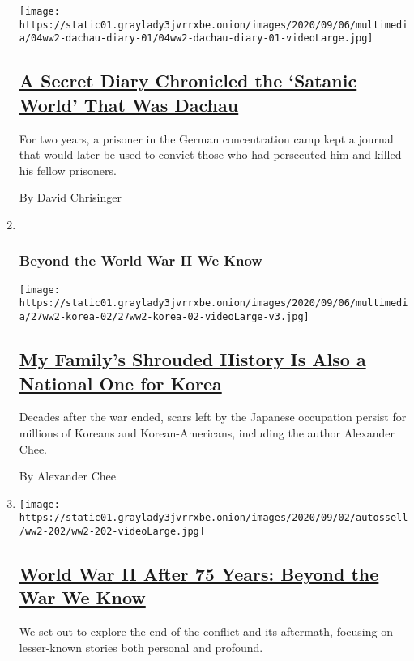 \begin{enumerate}
  \texttt{[image: https://static01.graylady3jvrrxbe.onion/images/2020/09/06/multimedia/04ww2-dachau-diary-01/04ww2-dachau-diary-01-videoLarge.jpg]}

  \hypertarget{a-secret-diary-chronicled-the-satanic-world-that-was-dachau}{%
  \subsection{\texorpdfstring{\href{/2020/09/04/magazine/-secret-diarist-dachau.html}{A
  Secret Diary Chronicled the `Satanic World' That Was
  Dachau}}{A Secret Diary Chronicled the `Satanic World' That Was Dachau}}\label{a-secret-diary-chronicled-the-satanic-world-that-was-dachau}}

  For two years, a prisoner in the German concentration camp kept a
  journal that would later be used to convict those who had persecuted
  him and killed his fellow prisoners.

  By David Chrisinger
\item ~
  \hypertarget{beyond-the-world-war-ii-we-know-1}{%
  \subsubsection{Beyond the World War II We
  Know}\label{beyond-the-world-war-ii-we-know-1}}

  \texttt{[image: https://static01.graylady3jvrrxbe.onion/images/2020/09/06/multimedia/27ww2-korea-02/27ww2-korea-02-videoLarge-v3.jpg]}

  \hypertarget{my-familys-shrouded-history-is-also-a-national-one-for-korea}{%
  \subsection{\texorpdfstring{\href{/2020/08/27/magazine/korea-japanese-occupation-surrender-ww2.html}{My
  Family's Shrouded History Is Also a National One for
  Korea}}{My Family's Shrouded History Is Also a National One for Korea}}\label{my-familys-shrouded-history-is-also-a-national-one-for-korea}}

  Decades after the war ended, scars left by the Japanese occupation
  persist for millions of Koreans and Korean-Americans, including the
  author Alexander Chee.

  By Alexander Chee
\item
  \texttt{[image: https://static01.graylady3jvrrxbe.onion/images/2020/09/02/autossell/ww2-202/ww2-202-videoLarge.jpg]}

  \hypertarget{world-war-ii-after-75-years-beyond-the-war-we-know}{%
  \subsection{\texorpdfstring{\href{/2020/09/02/magazine/ww-ii-75th-anniversary.html}{World
  War II After 75 Years: Beyond the War We
  Know}}{World War II After 75 Years: Beyond the War We Know}}\label{world-war-ii-after-75-years-beyond-the-war-we-know}}

  We set out to explore the end of the conflict and its aftermath,
  focusing on lesser-known stories both personal and profound.
\end{enumerate}

